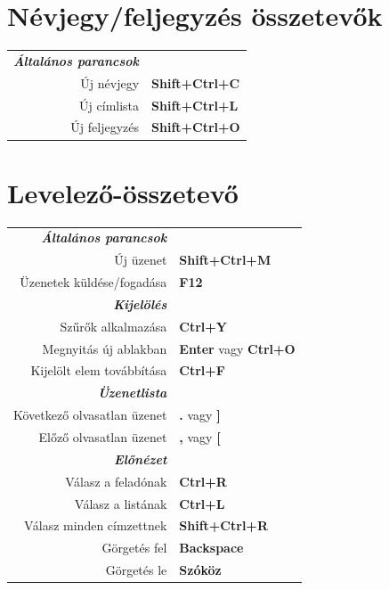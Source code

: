 \documentclass[12pt]{article}
\begin{document}
\begin{landscape}
\begin{center}
\begin{multicols}{2}
	\section*{Névjegy/feljegyzés összetevők}
	\begin{tabular*}{4in}{rp{1.5in}}
		\textit{\textbf{Általános parancsok}}	&					\\
		Új névjegy				& \textbf{Shift+Ctrl+C}			\\
		Új címlista				& \textbf{Shift+Ctrl+L}			\\
		Új feljegyzés				& \textbf{Shift+Ctrl+O}			\\
	\end{tabular*}
	\section*{Levelező-összetevő}
	\begin{tabular*}{4in}{rp{1.5in}}
		\textit{\textbf{Általános parancsok}}	&					\\
		Új üzenet				& \textbf{Shift+Ctrl+M}			\\
		\vspace{1.5mm}
		Üzenetek küldése/fogadása		& \textbf{F12}				\\
		\textit{\textbf{Kijelölés}}		&					\\
		Szűrők alkalmazása			& \textbf{Ctrl+Y}			\\
		Megnyitás új ablakban			& \textbf{Enter} vagy \textbf{Ctrl+O}	\\
		\vspace{1.5mm}
		Kijelölt elem továbbítása		& \textbf{Ctrl+F}			\\
		\textit{\textbf{Üzenetlista}}		&					\\
		Következő olvasatlan üzenet		& \textbf{.} vagy \textbf{]}		\\
		\vspace{1.5mm}
		Előző olvasatlan üzenet			& \textbf{,} vagy \textbf{[}		\\
		\textit{\textbf{Előnézet}}	&					\\
		Válasz a feladónak			& \textbf{Ctrl+R}			\\
		Válasz a listának			& \textbf{Ctrl+L}			\\
		Válasz minden címzettnek		& \textbf{Shift+Ctrl+R}			\\
		Görgetés fel				& \textbf{Backspace}			\\
		Görgetés le				& \textbf{Szóköz}			\\
	\end{tabular*}

\end{multicols}
\end{center}
\end{landscape}
\end{document}
